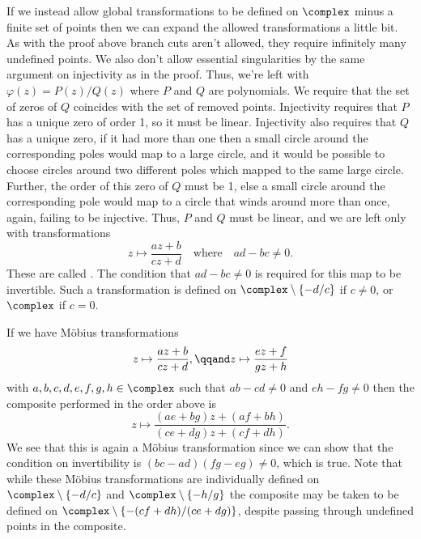 \documentclass[fleqn]{NotesClass}
\begin{document}
    If we instead allow global transformations to be defined on \(\complex\) minus a finite set of points then we can expand the allowed transformations a little bit.
    As with the proof above branch cuts aren't allowed, they require infinitely many undefined points.
    We also don't allow essential singularities by the same argument on injectivity as in the proof.
    Thus, we're left with \(\varphi(z) = P(z)/Q(z)\) where \(P\) and \(Q\) are polynomials.
    We require that the set of zeros of \(Q\) coincides with the set of removed points.
    Injectivity requires that \(P\) has a unique zero of order 1, so it must be linear.
    Injectivity also requires that \(Q\) has a unique zero, if it had more than one then a small circle around the corresponding poles would map to a large circle, and it would be possible to choose circles around two different poles which mapped to the same large circle.
    Further, the order of this zero of \(Q\) must be 1, else a small circle around the corresponding pole would map to a circle that winds around more than once, again, failing to be injective.
    Thus, \(P\) and \(Q\) must be linear, and we are left only with transformations
    \begin{equation}
        z \mapsto \frac{az + b}{cz + d} \quad \text{where} \quad ad - bc \ne 0.
    \end{equation}
    These are called .
    The condition that \(ad - bc \ne 0\) is required for this map to be invertible.
    Such a transformation is defined on \(\complex \setminus \{-d/c\}\) if \(c \ne 0\), or \(\complex\) if \(c = 0\).
    
    If we have M\"obius transformations
    \begin{equation}
        z \mapsto \frac{az + b}{cz + d}, \qqand z \mapsto \frac{ez + f}{gz + h}
    \end{equation}
    with \(a, b, c, d, e, f, g, h \in \complex\) such that \(ab - cd \ne 0\) and \(eh - fg \ne 0\) then the composite performed in the order above is
    \begin{equation}
        z \mapsto \frac{(ae + bg)z + (af + bh)}{(ce + dg)z + (cf + dh)}.
    \end{equation}
    We see that this is again a M\"obius transformation since we can show that the condition on invertibility is \((bc - ad)(fg - eg) \ne 0\), which is true.
    Note that while these M\"obius transformations are individually defined on \(\complex \setminus \{-d/c\}\) and \(\complex \setminus \{-h/g\}\) the composite may be taken to be defined on \(\complex \setminus \{-(cf + dh)/(ce + dg)\}\), despite passing through undefined points in the composite.
    
\end{document}
